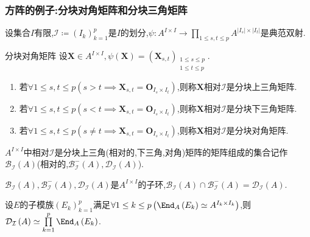 \subsubsection*{方阵的例子:分块对角矩阵和分块三角矩阵}

设集合$I$有限,$\mathcal{I}\coloneq\left(I_{k}\right)_{k=1}^{p}$是$I$的划分,$\psi:A^{I\times I}\to\prod\limits_{1\leq s,t\leq p}A^{\left|I_{s}\right|\times\left|I_{t}\right|}$是典范双射.

\begin{definition}{分块对角矩阵}{}
	设$\boldsymbol{X}\in A^{I\times I},\psi\left(\boldsymbol{X}\right)=\left(\boldsymbol{X}_{s,t}\right)_{\substack{1\leq s\leq p\\1\leq t\leq p}}$.
	\begin{enumerate}
		\item 若$\forall 1\leq s,t\leq p\left(s>t\implies\boldsymbol{X}_{s,t}=\boldsymbol{O}_{I_{s}\times I_{t}}\right)$,则称$\boldsymbol{X}$相对$\mathcal{I}$是分块上三角矩阵.
		\item 若$\forall 1\leq s,t\leq p\left(s<t\implies\boldsymbol{X}_{s,t}=\boldsymbol{O}_{I_{s}\times I_{t}}\right)$,则称$\boldsymbol{X}$相对$\mathcal{I}$是分块下三角矩阵.
		\item 若$\forall 1\leq s,t\leq p\left(s\neq t\implies\boldsymbol{X}_{s,t}=\boldsymbol{O}_{I_{s}\times I_{t}}\right)$,则称$\boldsymbol{X}$相对$\mathcal{I}$是分块对角矩阵.
	\end{enumerate}
	$A^{I\times I}$中相对$\mathcal{I}$是分块上三角(相对的,下三角,对角)矩阵的矩阵组成的集合记作$\mathcal{B}_{\mathcal{I}}\left(A\right)$(相对的,$\mathcal{B}_{\mathcal{I}}^{-}\left(A\right),\mathcal{D}_{\mathcal{I}}\left(A\right)$).
\end{definition}

\begin{proposition}{}{}
	$\mathcal{B}_{\mathcal{I}}\left(A\right),\mathcal{B}_{\mathcal{I}}^{-}\left(A\right),\mathcal{D}_{\mathcal{I}}\left(A\right)$是$A^{I\times I}$的子环,$\mathcal{B}_{\mathcal{I}}\left(A\right)\cap\mathcal{B}_{\mathcal{I}}^{-}\left(A\right)=\mathcal{D}_{\mathcal{I}}\left(A\right)$.
\end{proposition}

\begin{proposition}{}{}
	设$E$的子模族$\left(E_{k}\right)_{k=1}^{p}$满足$\forall 1\leq k\leq p\left(\End_{A}\left(E_{k}\right)\simeq A^{I_{k}\times I_{k}}\right)$,则$\mathcal{D}_{\mathcal{I}}\left(A\right)\simeq\prod\limits_{k=1}^{p}\End_{A}\left(E_{k}\right)$.
\end{proposition}







